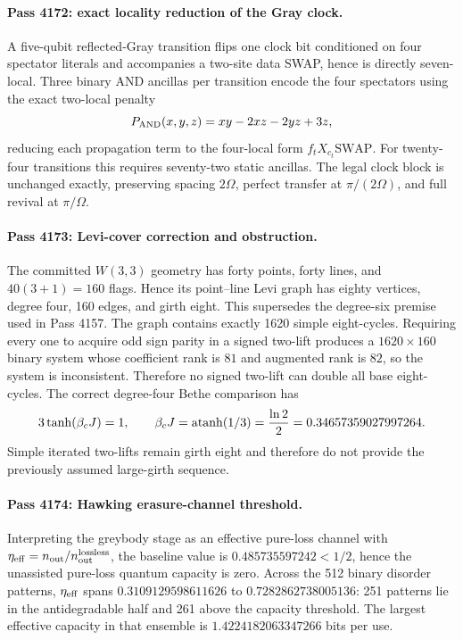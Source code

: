 \paragraph{Pass 4172: exact locality reduction of the Gray clock.}
A five-qubit reflected-Gray transition flips one clock bit conditioned on four spectator literals and accompanies a two-site data SWAP, hence is directly seven-local.  Three binary AND ancillas per transition encode the four spectators using the exact two-local penalty
\[
P_{\rm AND}(x,y,z)=xy-2xz-2yz+3z,
\]
reducing each propagation term to the four-local form $f_tX_{c_t}\mathrm{SWAP}$.  For twenty-four transitions this requires seventy-two static ancillas.  The legal clock block is unchanged exactly, preserving spacing $2\Omega$, perfect transfer at $\pi/(2\Omega)$, and full revival at $\pi/\Omega$.

\paragraph{Pass 4173: Levi-cover correction and obstruction.}
The committed $W(3,3)$ geometry has forty points, forty lines, and $40(3+1)=160$ flags.  Hence its point--line Levi graph has eighty vertices, degree four, 160 edges, and girth eight.  This supersedes the degree-six premise used in Pass 4157.  The graph contains exactly 1620 simple eight-cycles.  Requiring every one to acquire odd sign parity in a signed two-lift produces a $1620\times160$ binary system whose coefficient rank is $81$ and augmented rank is $82$, so the system is inconsistent.  Therefore no signed two-lift can double all base eight-cycles.  The correct degree-four Bethe comparison has
\[
3\tanh(\beta_cJ)=1,
\qquad
\beta_cJ=\operatorname{atanh}(1/3)={\ln2\over2}=0.34657359027997264.
\]
Simple iterated two-lifts remain girth eight and therefore do not provide the previously assumed large-girth sequence.

\paragraph{Pass 4174: Hawking erasure-channel threshold.}
Interpreting the greybody stage as an effective pure-loss channel with $\eta_{\rm eff}=n_{\rm out}/n_{\rm out}^{\rm lossless}$, the baseline value is $0.485735597242<1/2$, hence the unassisted pure-loss quantum capacity is zero.  Across the 512 binary disorder patterns, $\eta_{\rm eff}$ spans $0.3109129598611626$ to $0.7282862738005136$: 251 patterns lie in the antidegradable half and 261 above the capacity threshold.  The largest effective capacity in that ensemble is $1.4224182063347266$ bits per use.

